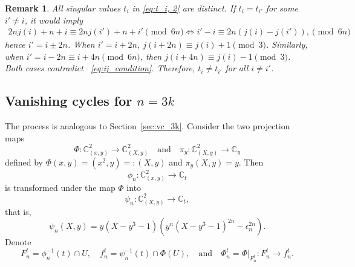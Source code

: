 \documentclass[10pt,a4paper,reqno]{amsart}
\newtheorem{rmk}[thm]{Remark}
\theoremstyle{definition}
\numberwithin{equation}{section}
\numberwithin{figure}{section}
\newcommand{\C}{\mathbb{C}}
\newcommand{\ep}{\epsilon}
\newcommand{\arrowr}{\rightarrow}
\begin{document}
%

\begin{rmk}
All singular values $t_i$ in \eqref{eq:t_i, 2} are distinct.
If $t_{i}=t_{i'}$ for some $i'\neq i$, it would imply 
\begin{align}\label{eq:ij_condition}
2nj(i)+n+i \equiv 2nj(i')+n+i' \pmod{6n} \Leftrightarrow i'-i\equiv 2n(j(i)-j(i')), \pmod{6n}\end{align}
hence $i'=i\pm 2n$.
When $i'=i+2n$, $j(i+2n)\equiv j(i)+1 \pmod 3$.
Similarly, when $i'=i-2n\equiv i+4n \pmod{6n}$, then $j(i+4n) \equiv j(i)-1 \pmod 3$.
Both cases contradict ~\eqref{eq:ij_condition}.
Therefore, $t_i \neq t_{i'}$ for all $i\neq i'$.
\end{rmk}

\subsection{Vanishing cycles for $n=3k$}
The process is analogous to Section~\ref{sec:vc_3k}.
Consider the two projection maps
\[ \Phi : \C_{(x,y)}^2 \to \C_{(X,y)}^2 \quad\text{and}\quad \pi_y : \mathbb{C}_{(X,y)}^2 \to \mathbb{C}_y\]
defined by $\Phi(x,y)=(x^2,y)=:(X,y)$ and $\pi_y(X,y)=y$.
Then \[\phi_n:\C_{(x,y)}^2 \arrowr \C_t\] is transformed under the map $\Phi$ into 
\[\psi_n: \C_{(X,y)}^2 \arrowr \C_t,\]
that is, 
\[\psi_n(X,y)=y(X-y^3-1)(y^n (X-y^3-1)^{2n}-{\ep_n^{2n}}).\]
Denote \[F_n^t=\phi_n^{-1}(t)\cap U, \quad f_n^t=\psi_n^{-1}(t)\cap \Phi(U), \quad\text{and}\quad \Phi_n^t=\Phi|_{F_n^t}: F_n^t \arrowr f_n^t.\]
\end{document}
